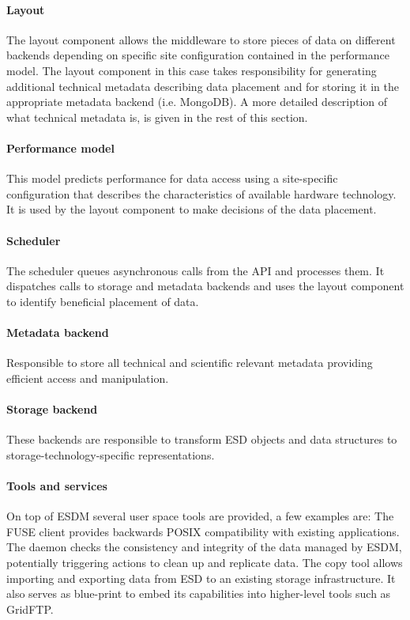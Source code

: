 \paragraph{Layout}
The layout component allows the middleware to store pieces of data on different backends depending on specific site configuration contained in the performance model.
The layout component in this case takes responsibility for generating additional technical metadata describing data placement and for storing it in the appropriate metadata backend (i.e. MongoDB).
A more detailed description of what technical metadata is, is given in the rest of this section.

\paragraph{Performance model}
This model predicts performance for data access using a site-specific configuration that describes the characteristics of available hardware technology.
It is used by the layout component to make decisions of the data placement.

\paragraph{Scheduler}
The scheduler queues asynchronous calls from the API and processes them.
It dispatches calls to storage and metadata backends and uses the layout component to identify beneficial placement of data.

\paragraph{Metadata backend}
Responsible to store all technical and scientific relevant metadata providing efficient access and manipulation.

\paragraph{Storage backend}
These backends are responsible to transform ESD objects and data structures to storage-technology-specific representations.

\paragraph{Tools and services}
On top of ESDM several user space tools are provided, a few examples are:
The FUSE client provides backwards POSIX compatibility with existing applications.
The daemon checks the consistency and integrity of the data managed by ESDM, potentially triggering actions to clean up and replicate data.
The copy tool allows importing and exporting data from ESD to an existing storage infrastructure.
It also serves as blue-print to embed its capabilities into higher-level tools such as GridFTP.

